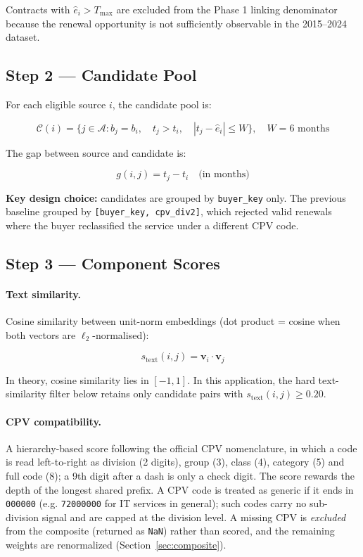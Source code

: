 \documentclass[12pt, a4paper]{article}
\begin{document}
Contracts with $\hat{e}_i > T_{\max}$ are excluded from the Phase 1 linking
denominator because the renewal opportunity is not sufficiently observable in
the 2015--2024 dataset.

\subsection{Step 2 --- Candidate Pool}

For each eligible source $i$, the candidate pool is:

\begin{equation}
  \mathcal{C}(i) = \bigl\{
    j \in \mathcal{A} :
    b_j = b_i,\quad
    t_j > t_i,\quad
    |t_j - \hat{e}_i| \leq W
  \bigr\},
  \quad W = 6 \text{ months}
\end{equation}

The gap between source and candidate is:

\begin{equation}
  g(i,j) = t_j - t_i \quad \text{(in months)}
\end{equation}

\textbf{Key design choice:} candidates are grouped by \texttt{buyer\_key} only.
The previous baseline grouped by \texttt{[buyer\_key, cpv\_div2]}, which
rejected valid renewals where the buyer reclassified the service under a
different CPV code.

\subsection{Step 3 --- Component Scores}

\paragraph{Text similarity.}
Cosine similarity between unit-norm embeddings (dot product = cosine when
both vectors are $\ell_2$-normalised):

\begin{equation}
  s_{\text{text}}(i,j) = \mathbf{v}_i \cdot \mathbf{v}_j
\end{equation}

\noindent In theory, cosine similarity lies in $[-1,1]$. In this application,
the hard text-similarity filter below retains only candidate pairs with
$s_{\text{text}}(i,j) \geq 0.20$.

\paragraph{CPV compatibility.}
A hierarchy-based score following the official CPV nomenclature, in which a code
is read left-to-right as division (2 digits), group (3), class (4), category (5)
and full code (8); a 9th digit after a dash is only a check digit. The score
rewards the depth of the longest shared prefix. A CPV code is treated as generic
if it ends in \texttt{000000} (e.g. \texttt{72000000} for IT services in
general); such codes carry no sub-division signal and are capped at the division
level. A missing CPV is \emph{excluded} from the composite (returned as
\texttt{NaN}) rather than scored, and the remaining weights are renormalized
(Section~\ref{sec:composite}).
\end{document}
